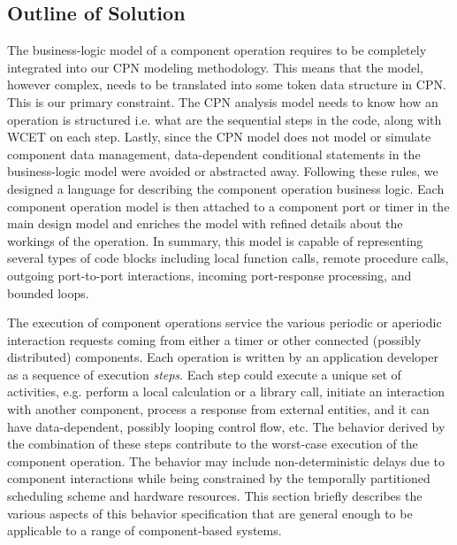 \subsection{Outline of Solution}
The business-logic model of a component operation requires to be completely integrated into our CPN modeling methodology. This means that the model, however complex, needs to be translated into some token data structure in CPN. This is our primary constraint. The CPN analysis model needs to know how an operation is structured i.e. what are the sequential steps in the code, along with WCET on each step. Lastly, since the CPN model does not model or simulate component data management, data-dependent conditional statements in the business-logic model were avoided or abstracted away. Following these rules, we designed a language for describing the component operation business logic. Each component operation model is then attached to a component port or timer in the main design model and enriches the model with refined details about the workings of the operation. In summary, this model is capable of representing several types of code blocks including local function calls, remote procedure calls, outgoing port-to-port interactions, incoming port-response processing, and bounded loops.

The execution of component operations service the various periodic or aperiodic interaction requests coming from either a timer or other connected (possibly distributed) components. Each operation is written by an application developer as a sequence of execution \emph{steps}. Each step could execute a unique set of activities, e.g. perform a local calculation or a library call, initiate an interaction with another component, process a response from external entities, and it can have data-dependent, possibly looping control flow, etc. The behavior derived by the combination of these steps contribute to the worst-case execution of the component operation. The behavior may include non-deterministic delays due to component interactions while being constrained by the  temporally partitioned scheduling scheme and hardware resources. This section briefly describes the various aspects of this behavior specification that are general enough to be applicable to a range of component-based systems.

